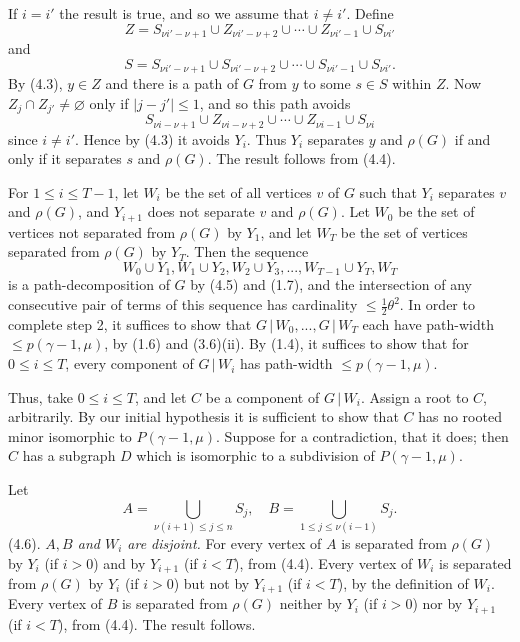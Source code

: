 If $i=i'$ the result is true, and so we assume that $i\ne i'$. Define
\begin{equation*}
Z=S_{\nu i'-\nu+1}\cup Z_{\nu i'-\nu+2}\cup\cdots\cup Z_{\nu i'-1}\cup S_{\nu i'}
\end{equation*}
and
\begin{equation*}
S=S_{\nu i'-\nu+1}\cup S_{\nu i'-\nu+2}\cup\cdots\cup S_{\nu i'-1}\cup S_{\nu i'}.
\end{equation*}
By (4.3), $y\in Z$ and there is a path of $G$ from $y$ to some $s\in S$ within $Z$.
Now $Z_j\cap Z_{j'}\ne\varnothing$ only if $|j-j'|\le 1$, and so this path avoids
\begin{equation*}
S_{\nu i-\nu+1}\cup Z_{\nu i-\nu+2}\cup\cdots\cup Z_{\nu i-1}\cup S_{\nu i}
\end{equation*}
since $i\ne i'$. Hence by (4.3) it avoids $Y_i$. Thus $Y_i$ separates $y$ and $\rho(G)$ if and
only if it separates $s$ and $\rho(G)$. The result follows from (4.4).

For $1\le i\le T-1$, let $W_i$ be the set of all vertices $v$ of $G$ such that $Y_i$
separates $v$ and $\rho(G)$, and $Y_{i+1}$ does not separate $v$ and $\rho(G)$. Let $W_0$ be the
set of vertices not separated from $\rho(G)$ by $Y_1$, and let $W_T$ be the set of
vertices separated from $\rho(G)$ by $Y_T$. Then the sequence
\begin{equation*}
W_0\cup Y_1, W_1\cup Y_2, W_2\cup Y_3,..., W_{T-1}\cup Y_T, W_T
\end{equation*}
is a path-decomposition of $G$ by (4.5) and (1.7), and the intersection of any
consecutive pair of terms of this sequence has cardinality ${\le}\frac12\theta^2$. In order to
complete step 2, it suffices to show that $G\,|\,W_0,..., G\,|\,W_T$ each have path-width
${\le}p(\gamma-1, \mu)$, by (1.6) and (3.6)(ii). By (1.4), it suffices to show that
for $0\le i\le T$, every component of $G\,|\,W_i$ has path-width ${\le}p(\gamma-1, \mu)$.

Thus, take $0\le i\le T$, and let $C$ be a component of $G\,|\,W_i$. Assign a root
to $C$, arbitrarily. By our initial hypothesis it is sufficient to show that $C$ has
no rooted minor isomorphic to $P(\gamma-1, \mu)$. Suppose for a contradiction, that
it does; then $C$ has a subgraph $D$ which is isomorphic to a subdivision of
$P(\gamma-1, \mu)$.

Let
\begin{equation*}
A=\bigcup_{\nu(i+1)\le j\le n}S_j,\quad B=\bigcup_{1\le j\le\nu(i-1)}S_j.
\end{equation*}
\stmt
(4.6). \textit{$A, B$ and $W_i$ are disjoint.}
\stmt
For every vertex of $A$ is separated from $\rho(G)$ by $Y_i$ (if $i>0$) and by $Y_{i+1}$
(if $i<T$), from (4.4). Every vertex of $W_i$ is separated from $\rho(G)$ by $Y_i$ (if
$i>0$) but not by $Y_{i+1}$ (if $i<T$), by the definition of $W_i$. Every vertex of $B$ is
separated from $\rho(G)$ neither by $Y_i$ (if $i>0$) nor by $Y_{i+1}$ (if $i<T$), from (4.4).
The result follows.
